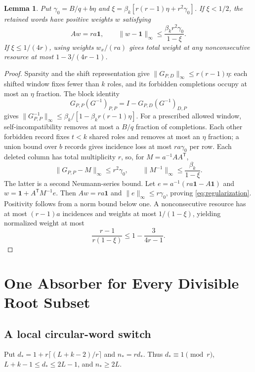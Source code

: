 \documentclass[12pt,letterpaper,onecolumn]{article}
\newtheorem{lemma}[theorem]{Lemma}
\theoremstyle{definition}
\newcommand{\one}{\mathbf 1}
\begin{document}
\begin{lemma}\label{lem:regularize}
Put $\gamma_0=B/q+b\eta$ and $\xi=\beta_k[r(r-1)\eta+r^2\gamma_0]$. If $\xi<1/2$, the retained words have positive weights $w$ satisfying
\begin{equation}
 Aw=ra\one,\qquad\|w-\one\|_\infty\le\frac{\beta_k r^2\gamma_0}{1-\xi}.
 \label{eq:regularization}
\end{equation}
If $\xi\le1/(4r)$, using weights $w_x/(ra)$ gives total weight at any nonconsecutive resource at most $1-3/(4r-1)$.
\end{lemma}
\begin{proof}
Sparsity and the shift representation give $\|G_{P,D}\|_\infty\le r(r-1)\eta$: each shifted window fixes fewer than $k$ roles, and its forbidden completions occupy at most an $\eta$ fraction. The block identity
\[
 G_{P,P}(G^{-1})_{P,P}=I-G_{P,D}(G^{-1})_{D,P}
\]
gives $\|G_{P,P}^{-1}\|_\infty\le\beta_k/[1-\beta_k r(r-1)\eta]$. For a prescribed allowed window, self-incompatibility removes at most a $B/q$ fraction of completions. Each other forbidden record fixes $t<k$ shared roles and removes at most an $\eta$ fraction; a union bound over $b$ records gives incidence loss at most $ra\gamma_0$ per row. Each deleted column has total multiplicity $r$, so, for $M=a^{-1}AA^{\mathsf T}$,
\[
 \|G_{P,P}-M\|_\infty\le r^2\gamma_0,\qquad
 \|M^{-1}\|_\infty\le\frac{\beta_k}{1-\xi}.
\]
The latter is a second Neumann-series bound. Let $e=a^{-1}(ra\one-A\one)$ and $w=\one+A^{\mathsf T}M^{-1}e$. Then $Aw=ra\one$ and $\|e\|_\infty\le r\gamma_0$, proving \eqref{eq:regularization}. Positivity follows from a norm bound below one. A nonconsecutive resource has at most $(r-1)a$ incidences and weights at most $1/(1-\xi)$, yielding normalized weight at most
\[
 \frac{r-1}{r(1-\xi)}\le1-\frac3{4r-1}.
\]
\end{proof}

\section{One Absorber for Every Divisible Root Subset}
\subsection{A local circular-word switch}
Put $d_*=1+r\lceil(L+k-2)/r\rceil$ and $n_*=rd_*$. Thus $d_*\equiv1\pmod r$, $L+k-1\le d_*\le2L-1$, and $n_*\ge2L$.
\end{document}
